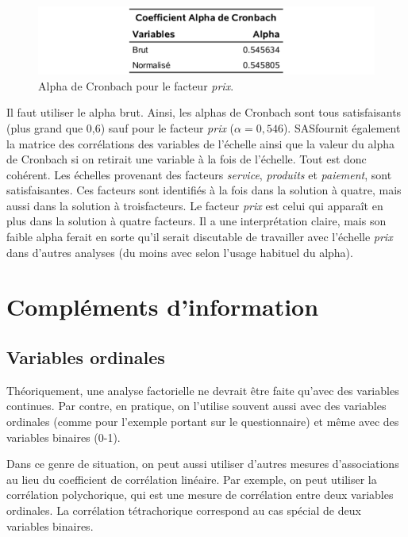 \documentclass[
]{book}
\theoremstyle{definition}
\theoremstyle{definition}
\theoremstyle{definition}
\theoremstyle{remark}
\begin{document}
\begin{figure}

{\centering \includegraphics[width=0.85\linewidth]{figures/01-facto-e11} 

}

\caption{Alpha de Cronbach pour le facteur \emph{prix}.}\label{fig:fig1p11}
\end{figure}

Il faut utiliser le alpha brut. Ainsi, les alphas de Cronbach sont tous
satisfaisants (plus grand que 0,6) sauf pour le facteur \emph{prix} (\(\alpha=0,546\)). \textsf{SAS}fournit également la matrice des corrélations des variables de l'échelle ainsi que la valeur du alpha de Cronbach si on retirait une variable à la fois de l'échelle. Tout est donc cohérent. Les échelles provenant des facteurs \emph{service}, \emph{produits} et \emph{paiement}, sont satisfaisantes. Ces facteurs sont identifiés à la fois dans la solution à quatre, mais aussi dans la solution à troisfacteurs. Le facteur \emph{prix} est celui qui apparaît en plus dans la solution à quatre facteurs. Il a une interprétation claire, mais son faible alpha ferait en sorte qu'il serait discutable de travailler avec l'échelle \emph{prix} dans d'autres analyses (du moins avec selon l'usage habituel du alpha).

\hypertarget{compluxe9ments-dinformation}{%
\section{Compléments d'information}\label{compluxe9ments-dinformation}}

\hypertarget{variables-ordinales}{%
\subsection{Variables ordinales}\label{variables-ordinales}}

Théoriquement, une analyse factorielle ne devrait être faite qu'avec des
variables continues. Par contre, en pratique, on l'utilise souvent aussi avec des variables ordinales (comme pour l'exemple portant sur le questionnaire) et même avec des variables binaires (0-1).

Dans ce genre de situation, on peut aussi utiliser d'autres mesures d'associations au lieu du coefficient de corrélation linéaire. Par exemple, on peut utiliser la corrélation polychorique, qui est une mesure de corrélation entre deux variables ordinales. La corrélation tétrachorique correspond au cas spécial de deux variables binaires.
\end{document}
